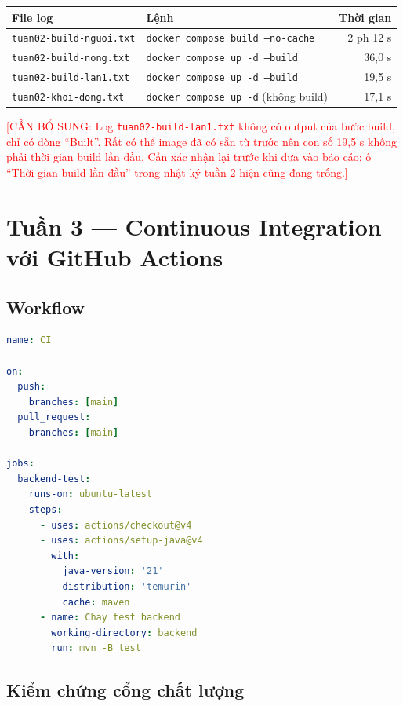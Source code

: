 \documentclass[12pt,a4paper]{article}
\newcommand{\canbosung}[1]{\textcolor{red}{[CẦN BỔ SUNG: #1]}}
\newcommand{\commit}[1]{\texttt{#1}}
\begin{document}
\begin{center}
\begin{tabular}{llr}
\toprule
File log & Lệnh & Thời gian \\
\midrule
\texttt{tuan02-build-nguoi.txt} & \texttt{docker compose build --no-cache} & 2 ph 12 s \\
\texttt{tuan02-build-nong.txt}  & \texttt{docker compose up -d --build} & 36,0 s \\
\texttt{tuan02-build-lan1.txt}  & \texttt{docker compose up -d --build} & 19,5 s \\
\texttt{tuan02-khoi-dong.txt}   & \texttt{docker compose up -d} (không build) & 17,1 s \\
\bottomrule
\end{tabular}
\end{center}

\canbosung{Log \texttt{tuan02-build-lan1.txt} không có output của bước build, chỉ có
dòng ``Built''. Rất có thể image đã có sẵn từ trước nên con số 19,5 s không phải
thời gian build lần đầu. Cần xác nhận lại trước khi đưa vào báo cáo; ô ``Thời gian
build lần đầu'' trong nhật ký tuần 2 hiện cũng đang trống.}

\section{Tuần 3 — Continuous Integration với GitHub Actions}

\subsection{Workflow}

\begin{lstlisting}[language=YAML, caption={\texttt{.github/workflows/ci.yml} (commit \commit{66820fe})}]
name: CI

on:
  push:
    branches: [main]
  pull_request:
    branches: [main]

jobs:
  backend-test:
    runs-on: ubuntu-latest
    steps:
      - uses: actions/checkout@v4
      - uses: actions/setup-java@v4
        with:
          java-version: '21'
          distribution: 'temurin'
          cache: maven
      - name: Chay test backend
        working-directory: backend
        run: mvn -B test
\end{lstlisting}

\subsection{Kiểm chứng cổng chất lượng}
\end{document}
